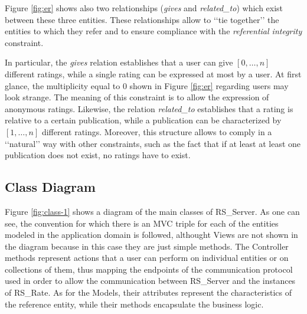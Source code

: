 \documentclass[a4paper, english]{article}
\begin{document}
Figure \ref{fig:er} shows also two relationships (\emph{gives} and \emph{related\_to}) which exist between these three entities. These relationships allow to \lq\lq tie together\rq\rq{} the entities to which they refer and to ensure compliance with the \emph{referential integrity} constraint.

In particular, the \emph{gives} relation establishes that a user can give $[0,\dots ,n]$ different ratings, while a single rating can be expressed at most by a user. At first glance, the multiplicity equal to $0$ shown in Figure \ref{fig:er} regarding users may look strange. The meaning of this constraint is to allow the expression of anonymous ratings. Likewise, the relation \emph{related\_to} establishes that a rating is relative to a certain  publication, while a publication can be characterized by $[1,\dots ,n]$ different ratings. Moreover, this structure allows to comply in a \lq\lq natural\rq\rq{} way with other constraints, such as the fact that if at least at least one publication does not exist, no ratings have to exist.

\subsection{Class Diagram}

Figure \ref{fig:class-1} shows a diagram of the main classes of RS\_Server. As one can see, the convention for which there is an MVC triple for each of the entities modeled in the application domain is followed, althought Views are not shown in the diagram because in this case they are just simple methods. The Controller methods represent actions that a user can perform on individual entities or on collections of them, thus mapping the endpoints of the communication protocol used in order to allow the communication between RS\_Server and the instances of RS\_Rate. As for the Models, their attributes represent the characteristics of the reference entity, while their methods encapsulate the business logic.
\end{document}

